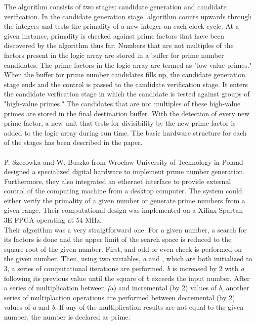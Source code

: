 \documentclass[journal]{IEEEtran}
\begin{document}
The algorithm consists of two stages: candidate generation and candidate verification. In the candidate generation stage, algorithm counts upwards through the integers and tests the primality of a new integer on each clock cycle. At a given instance, primality is checked against prime factors that have been discovered by the algorithm thus far. Numbers that are not multiples of the factors present in the logic array are stored in a buffer for prime number candidates. The prime factors in the logic array are termed as "low-value primes." When the buffer for prime number candidates fills up, the candidate generation stage ends and the control is passed to the candidate verification stage. It enters the candidate verfication stage in which the candidate is tested against groups of "high-value primes." The candidates that are not multiples of these high-value primes are stored in the final destination buffer. With the detection of every new prime factor, a new unit that tests for divisibility by the new prime factor is added to the logic array during run time. The basic hardware structure for each of the stages has been described in the paper. \\

\\
P. Szecowka and W. Buszko from Wroclaw University of Technology in Poland designed a specialized digital hardware to implement prime number generation. Furthermore, they also integrated an ethernet interface to provide external control of the computing machine from a desktop computer. The system could either verify the primality of a given number or generate prime numbers from a given range. Their computational design was implemented on a Xilinx Spartan 3E FPGA operating at 54 MHz. \\

Their algorithm was a very straigtforward one. For a given number, a search for its factors is done and the upper limit of the search space is reduced to the square root of the given number. First, and odd-or-even check is performed on the given number. Then, using two variables, \textit{a} and , which are both initialized to 3, a series of computational iterations are performed. \textit{b} is increased by 2 with \textit{a} following its previous value until the square of \textit{b} exceeds the input number. After a series of multiplication between \textit(a) and incremental (by 2) values of \textit{b}, another series of multiplaction operations are performed between decremental (by 2) values of \textit{a} and \textit{b}. If any of the multiplication results are not equal to the given number, the number is declared as prime\cite{polandPrime}. \\
\end{document}
